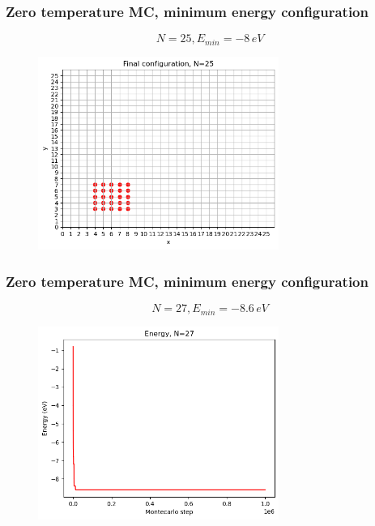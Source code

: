 \documentclass{beamer}
\begin{document}
\begin{frame}
    \frametitle{Zero temperature MC, minimum energy configuration}

    $$N=25, E_{min}= -8\,eV$$

    \begin{figure}
        \includegraphics[width=0.7\textwidth]{images/finconf25a.png}
    \end{figure}

\end{frame}

\begin{frame}
    \frametitle{Zero temperature MC, minimum energy configuration}

    $$N=27, E_{min}= -8.6\,eV$$

    \begin{figure}
        \includegraphics[width=0.7\textwidth]{images/energy27a.png}
    \end{figure}

\end{frame}
\end{document}
